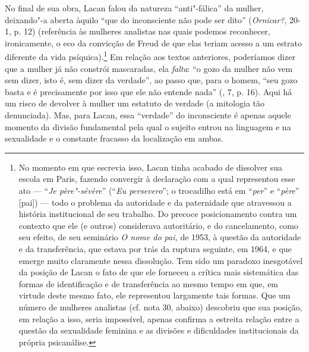 No final de sua obra, Lacan falou da natureza ``anti"-fálica'' da mulher,
deixando"-a aberta àquilo ``que do inconsciente não pode ser dito''
(\emph{Ornicar?}, 20-1, p. 12) (referência às mulheres analistas nas %
quais podemos reconhecer, ironicamente, o eco da convicção de Freud de
que elas teriam acesso a um estrato diferente da vida
psíquica).\footnote{No momento em que escrevia isso, Lacan tinha acabado
  de dissolver sua escola em Paris, fazendo convergir à declaração com a
  qual representou esse ato --- ``\emph{Je père"-sévère}'' (``\emph{Eu
  persevero}''; o trocadilho está em ``\emph{per}'' e ``\emph{père}''
  [pai]) --- todo o problema da autoridade e da paternidade que
  atravessou a história institucional de seu trabalho. Do precoce
  posicionamento contra um contexto que ele (e outros) considerava
  autoritário, e do cancelamento, como seu efeito, de seu seminário
  \emph{O nome do pai,} de 1953, à questão da autoridade e da
  transferência, que estava por trás da ruptura seguinte, em 1964, e que
  emerge muito claramente nessa dissolução. Tem sido um paradoxo
  inesgotável da posição de Lacan o fato de que ele forneceu a crítica
  mais sistemática das formas de identificação e de transferência ao
  mesmo tempo em que, em virtude deste mesmo fato, ele representou
  largamente tais formas. Que um número de mulheres analistas (cf. nota
  30, abaixo) descobriu que sua posição, em relação a isso, seria
  impossível, apenas confirma a estreita relação entre a questão da
  sexualidade feminina e as divisões e dificuldades institucionais da
  própria psicanálise.} Em relação aos textos anteriores, poderíamos
dizer que a mulher já não constrói mascaradas, ela \emph{falta}: ``o
gozo da mulher não vem sem dizer, isto é, sem dizer da verdade'', ao
passo que, para o homem, ``seu gozo basta e é precisamente por isso que
ele não entende nada'' (, 7, p. 16). Aqui há um risco de devolver à %
mulher um estatuto de verdade (a mitologia tão denunciada). Mas, para
Lacan, essa ``verdade'' do inconsciente é apenas aquele momento da
divisão fundamental pela qual o sujeito entrou na linguagem e na
sexualidade e o constante fracasso da localização em ambas.

